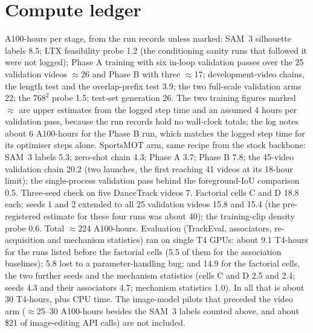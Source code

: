 \documentclass{article} %
\newcommand{\rev}[1]{{\color{blue}#1}}
\begin{document}
\section{Compute ledger}
\label{app:compute}
A100-hours per stage, from the run records \rev{unless marked}: SAM~3 silhouette labels 8.5; \rev{LTX
feasibility probe 1.2 (the conditioning sanity runs that followed it were not logged)}; Phase A
training with six in-loop validation passes over the 25 validation videos $\approx$26 \rev{and
Phase B with three $\approx$17; development-video chains, the
length test and the overlap-prefix test 3.9}; the two full-scale validation arms 22; the $768^2$ probe 1.5; test-set generation 26.
\rev{The two training figures marked $\approx$ are upper estimates from the logged step time and
an assumed 4 hours per validation pass, because the run records hold no wall-clock totals;
the log notes about 6 A100-hours for the Phase B run, which matches the logged step time
for its optimiser steps alone.}
SportsMOT arm, same recipe from the stock backbone: SAM~3 labels 5.3; zero-shot chain 4.3;
Phase A 3.7; Phase B 7.8; the 45-video validation chain 20.2 (two launches, the first
reaching 41 videos at its 18-hour limit); the single-process validation pass behind the
foreground-IoU comparison 0.5. Three-seed check on five DanceTrack videos 7.
\rev{Factorial cells C and D 18.8 each; seeds 1 and 2 extended to all 25
validation videos 15.8 and 15.4 (the pre-registered estimate for these four runs was about 40);
the training-clip density probe 0.6.} Total $\approx$\rev{224} A100-hours. \rev{Evaluation
(TrackEval, associators, re-acquisition and mechanism statistics) ran on single T4 GPUs:
about 9.1 T4-hours for the runs listed before the factorial cells (5.5 of them for the
association baselines); 5.8 lost to a parameter-handling bug; and 14.9 for the factorial
cells, the two further seeds and the mechanism statistics (cells C and D 2.5 and 2.4; seeds
4.3 and their associators 4.7; mechanism statistics 1.0). In all that is about 30 T4-hours,
plus CPU time.} The image-model pilots that
preceded the video arm ($\approx$\rev{25--30} A100-hours \rev{besides the SAM~3 labels counted
above}, and about \$21 of image-editing API calls) are not included.
\end{document}
